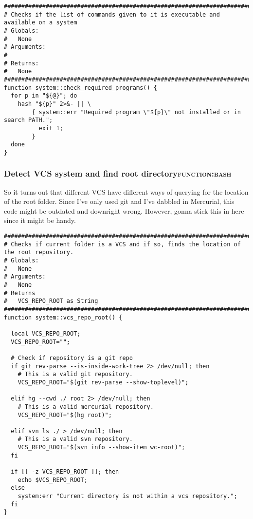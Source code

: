 \documentclass[11pt]{article}
\begin{document}
\begin{verbatim}
#####################################################################################
# Checks if the list of commands given to it is executable and available on a system
# Globals:
#   None
# Arguments:
#
# Returns:
#   None
#####################################################################################
function system::check_required_programs() {
  for p in "${@}"; do
    hash "${p}" 2>&- || \
        { system::err "Required program \"${p}\" not installed or in search PATH.";
          exit 1;
        }
  done
}
\end{verbatim}

\subsubsection{Detect VCS system and find root directory\hfill{}\textsc{function:bash}}
\label{sec:org2760ca8}

So it turns out that different VCS have different ways of querying for the location of the root folder. Since I've only used git and I've dabbled in Mercurial, this code might be outdated and downright wrong. However, gonna stick this in here since it might be handy.

\begin{verbatim}
##########################################################################################
# Checks if current folder is a VCS and if so, finds the location of the root repository.
# Globals:
#   None
# Arguments:
#   None
# Returns
#   VCS_REPO_ROOT as String
##########################################################################################
function system::vcs_repo_root() {

  local VCS_REPO_ROOT;
  VCS_REPO_ROOT="";

  # Check if repository is a git repo
  if git rev-parse --is-inside-work-tree 2> /dev/null; then
    # This is a valid git repository.
    VCS_REPO_ROOT="$(git rev-parse --show-toplevel)";

  elif hg --cwd ./ root 2> /dev/null; then
    # This is a valid mercurial repository.
    VCS_REPO_ROOT="$(hg root)";

  elif svn ls ./ > /dev/null; then
    # This is a valid svn repository.
    VCS_REPO_ROOT="$(svn info --show-item wc-root)";
  fi

  if [[ -z VCS_REPO_ROOT ]]; then
    echo $VCS_REPO_ROOT;
  else
    system:err "Current directory is not within a vcs repository.";
  fi 
}
\end{verbatim}
\end{document}
